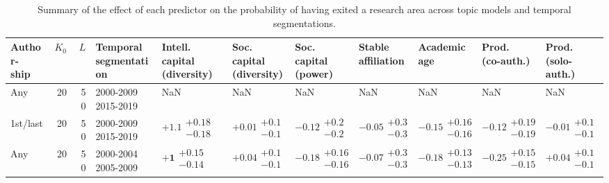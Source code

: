 \begin{table}[H]
\caption{Summary of the effect of each predictor on the probability of having exited a research area across topic models and temporal segmentations.}
\label{table:full_summary_exited}
\renewcommand{\arraystretch}{2}\fontsize{6}{7}\selectfont\begin{tabular}{lrrllllllll}
\toprule
\makecell{Author-\\ ship} & $K_0$ & $L$ & \makecell{Temporal \\ segmentation} & \makecell{Intell. capital \\ (diversity)} & \makecell{Soc. capital \\ (diversity)} & \makecell{Soc. capital \\ (power)} & \makecell{Stable \\ affiliation} & \makecell{Academic \\ age} & \makecell{Prod. \\ (co-auth.)} & \makecell{Prod. \\ (solo-auth.)} \\
\midrule
Any & 20 & 50 & \makecell{2000-2009 \\ 2015-2019} & NaN & NaN & NaN & NaN & NaN & NaN & NaN \\
1st/last & 20 & 50 & \makecell{2000-2009 \\ 2015-2019} & $\bm{+1.1}\substack{+0.18 \\ -0.18}$ & $+0.01\substack{+0.1 \\ -0.1}$ & $-0.12\substack{+0.2 \\ -0.2}$ & $-0.05\substack{+0.3 \\ -0.3}$ & $-0.15\substack{+0.16 \\ -0.16}$ & $-0.12\substack{+0.19 \\ -0.19}$ & $-0.01\substack{+0.1 \\ -0.1}$ \\
Any & 20 & 50 & \makecell{2000-2004 \\ 2005-2009} & $\bm{+1}\substack{+0.15 \\ -0.14}$ & $+0.04\substack{+0.1 \\ -0.1}$ & $\bm{-0.18}\substack{+0.16 \\ -0.16}$ & $-0.07\substack{+0.3 \\ -0.3}$ & $\bm{-0.18}\substack{+0.13 \\ -0.13}$ & $\bm{-0.25}\substack{+0.15 \\ -0.15}$ & $+0.04\substack{+0.1 \\ -0.1}$ \\

\end{tabular}
\end{table}
